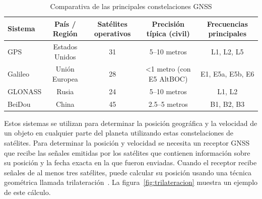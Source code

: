 \begin{itemize}
    \begin{table}[h]
        \centering
        \footnotesize
        \begin{tabular}{|l|c|c|c|c|}
            \hline
            \textbf{Sistema} & \textbf{País / Región} & \textbf{Satélites operativos} & \textbf{Precisión típica (civil)} & \textbf{Frecuencias principales} \\
            \hline
            GPS              & Estados Unidos         & 31                            & 5–10 metros                       & L1, L2, L5                       \\
            \hline
            Galileo          & Unión Europea          & 28                            & <1 metro (con E5 AltBOC)          & E1, E5a, E5b, E6                 \\
            \hline
            GLONASS          & Rusia                  & 24                            & 5–10 metros                       & L1, L2                           \\
            \hline
            BeiDou           & China                  & 45                            & 2.5–5 metros                      & B1, B2, B3                       \\
            \hline
        \end{tabular}
        \caption{Comparativa de las principales constelaciones GNSS}
        \label{tab:gnss_constellations}
    \end{table}


    Estos sistemas se utilizan para determinar la posición geográfica y la velocidad de un objeto en cualquier parte del planeta utilizando estas constelaciones de satélites.
    Para determinar la posición y velocidad se necesita un receptor GNSS que recibe las señales emitidas por los satélites que contienen información sobre su posición y la fecha exacta en la que fueron enviadas.
    Cuando el receptor recibe señales de al menos tres satélites, puede calcular su posición usando una técnica geométrica llamada trilateración~\cite{trilateracion}.
    La figura~\ref{fig:trilateracion} muestra un ejemplo de este cálculo.


\end{itemize}
